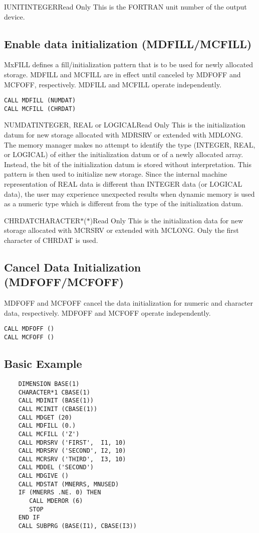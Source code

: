 \begin{argy}{IUNIT}{INTEGER}{Read Only}
This is the FORTRAN unit number of the output device.
\end{argy}


\subsection{Enable data initialization (MDFILL/MCFILL)}
MxFILL defines a fill/initialization pattern that is to be used
for newly allocated storage. MDFILL and MCFILL are in effect until canceled
by MDFOFF and MCFOFF, respectively.  MDFILL and MCFILL operate
independently.
\begin{verbatim}
CALL MDFILL (NUMDAT)
CALL MCFILL (CHRDAT)
\end{verbatim}

\begin{argy}{NUMDAT}{INTEGER, REAL or LOGICAL}{Read Only}
This is the initialization datum for new storage al\-lo\-cat\-ed with MDRSRV
or extended with MDLONG. The memory manager makes no attempt to identify the
type (INTEGER, REAL, or LOGICAL) of either the initialization datum or of a
newly allocated array. Instead, the bit of the initialization datum is
stored without interpretation. This pattern is then used to initialize new
storage. Since the internal machine representation of REAL data is different
than INTEGER data (or LOGICAL data), the user may experience unexpected
results when dynamic memory is used as a numeric type which is different
from the type of the initialization datum.
\end{argy}

\begin{argy}{CHRDAT}{CHARACTER$*$($*$)}{Read Only}
This is the initialization data for new storage al\-lo\-cat\-ed with MCRSRV or
extended with MCLONG. Only the first character of CHRDAT is used.
\end{argy}

\subsection{Cancel Data Initialization (MDFOFF/MCFOFF)}
MDFOFF and MCFOFF cancel the data initialization for numeric and character
data, respectively.  MDFOFF and MCFOFF operate independently.
\begin{verbatim}
CALL MDFOFF ()
CALL MCFOFF ()
\end{verbatim}

\subsection{Basic Example}
\begin{verbatim}
    DIMENSION BASE(1)
    CHARACTER*1 CBASE(1)
    CALL MDINIT (BASE(1))
    CALL MCINIT (CBASE(1))
    CALL MDGET (20)
    CALL MDFILL (0.)
    CALL MCFILL ('Z')
    CALL MDRSRV ('FIRST',  I1, 10)
    CALL MDRSRV ('SECOND', I2, 10)
    CALL MCRSRV ('THIRD',  I3, 10)
    CALL MDDEL ('SECOND')
    CALL MDGIVE ()
    CALL MDSTAT (MNERRS, MNUSED)
    IF (MNERRS .NE. 0) THEN
       CALL MDEROR (6)
       STOP
    END IF
    CALL SUBPRG (BASE(I1), CBASE(I3))
\end{verbatim}

